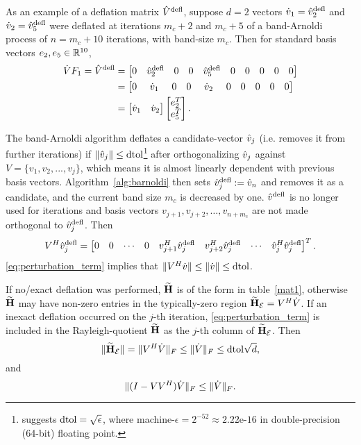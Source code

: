 As an example of a deflation matrix $ \hat{V}^{\text{defl}} $,  suppose $d=2$ vectors $\dot{v}_1=\hat{v}^{\text{defl}}_2$ and $\dot{v}_2=\hat{v}^{\text{defl}}_5$ were deflated at iterations $m_c+2$ and $m_c+5$ of a band-Arnoldi process of $n=m_c+10$ iterations, with band-size $m_c$. Then for standard basis vectors $e_2,e_5\in\mathbb{R}^{10}$,
\begin{equation}
\begin{aligned}
\Vd F_1  = \Vh^\defl &=  \mat{0&\vh^\defl_2&0&0&\vh^\defl_5&0&0&0&0&0} \\
&= \mat{0&\ \vd_1\ &0&0&\ \vd_2\ &0&0&0&0&0}\\
&= \mat{\vd_1&\vd_2}\mat{e_2^T \\ e_5^T}.
\end{aligned}
\label{eq:ex_V_defl}
\end{equation}

The band-Arnoldi algorithm deflates a candidate-vector $\hat{v}_j$ (i.e. removes it from further iterations) if $\| \hat{v}_j \|\leq \text{dtol}$\footnote{\cite{parlett1979lanczos} suggests $\text{dtol} =\sqrt{\epsilon}$, where machine-$\epsilon = 2^{-52} \approx 2.22\text{e-16}$ in double-precision (64-bit) floating point.}  after orthogonalizing $\hat{v}_j$  against $V=\{v_1,v_2,...,v_j\}$, which means it is almost linearly dependent with previous basis vectors.  Algorithm~\ref{alg:barnoldi} then sets $\hat{v}^{\text{defl}}_j:=\hat{v}_n$ and removes it as a candidate, and the current band size $m_c$ is decreased by one.   $\hat{v}^{\text{defl}}$ is no longer used for iterations and basis vectors $v_{j+1},v_{j+2},\ldots,v_{n+m_c}$ are not made orthogonal to  $\hat{v}_j^{\text{defl}}$.   Then 
\begin{equation}
V^H \hat{v}_j^{\text{defl}}= \begin{bmatrix} 0&0&\cdots&0&v_{j+1}^H\hat{v}_j^{\text{defl}}&  v_{j+2}^H\hat{v}_j^{\text{defl}}&\cdots&\hat{v}_j^H\hat{v}_j^{\text{defl}}\end{bmatrix}^T.
\label{eq:perturbation_term}
\end{equation}
\eqref{eq:perturbation_term} implies that $\| V^H \dot{v} \| \leq \| \dot{v}\| \leq \text{dtol}$.

If no/exact deflation was performed,  $\widetilde{\textbf{\textup{H}}}$ is of the form in table~\ref{mat1}, otherwise $\widetilde{\textbf{\textup{H}}}$ may have non-zero entries in the typically-zero region $\widetilde{\textbf{\textup{H}}}_\mathcal{E}=V^H\dot{V}$.     
If an inexact deflation occurred on the $j$-th iteration, \eqref{eq:perturbation_term} is included in 
the Rayleigh-quotient $\widetilde{\textbf{\textup{H}}}$ as the $j$-th column of $\widetilde{\textbf{\textup{H}}}_\mathcal{E}$.  
Then 
\begin{equation}
\|\widetilde{\textbf{\textup{H}}}_\mathcal{E} \| = \| V^H\dot{V}  \|_F \leq \| \dot{V}\|_F  \leq \text{dtol} \sqrt{d}, 
\end{equation}
and
\begin{equation}
\| (I-VV^H) \dot{V} \|_F \leq\| \dot{V}\|_F . 
\label{eq:vdot_norm_bound}
\end{equation}



